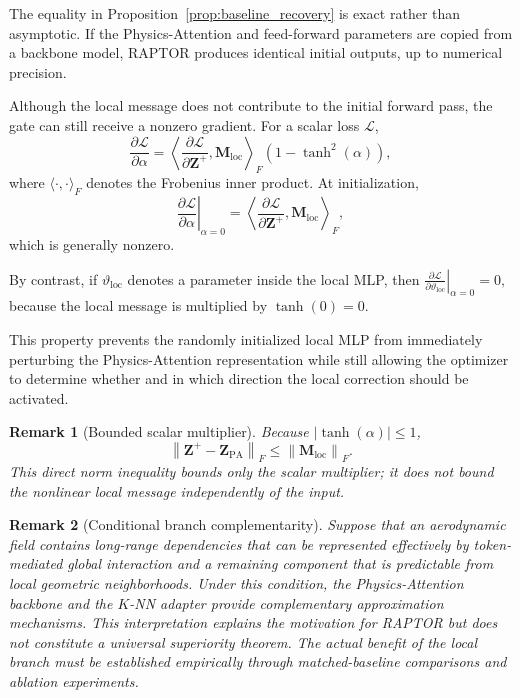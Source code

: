 \documentclass[a4paper,fleqn]{cas-sc}
\newtheorem{remark}{Remark}[section]
\begin{document}
The equality in Proposition~\ref{prop:baseline_recovery} is exact rather than asymptotic. If the Physics-Attention and feed-forward parameters are copied from a backbone model, RAPTOR produces identical initial outputs,
up to numerical precision. 

Although the local message does not contribute to the initial forward pass, the gate can still receive a nonzero gradient. For a scalar loss \(\mathcal L\),
\begin{equation}
    \frac{\partial\mathcal L}{\partial\alpha}
    =
    \left\langle
        \frac{\partial\mathcal L}
        {\partial\mathbf Z^{+}},
        \mathbf M_{\mathrm{loc}}
    \right\rangle_F
    \left(
        1-\tanh^2(\alpha)
    \right),
    \label{eq:gate_gradient}
\end{equation}
where \(\langle\cdot,\cdot\rangle_F\) denotes the Frobenius inner product. At initialization,
\begin{equation}
    \left.
        \frac{\partial\mathcal L}{\partial\alpha}
    \right|_{\alpha=0}
    =
    \left\langle
        \frac{\partial\mathcal L}
        {\partial\mathbf Z^{+}},
        \mathbf M_{\mathrm{loc}}
    \right\rangle_F,
    \label{eq:initial_gate_gradient}
\end{equation}
which is generally nonzero.

By contrast, if \(\vartheta_{\mathrm{loc}}\) denotes a parameter inside the local MLP, then $\left.
        \frac{\partial\mathcal L}
        {\partial\vartheta_{\mathrm{loc}}}
    \right|_{\alpha=0}
    =
    0,$
because the local message is multiplied by \(\tanh(0)=0\).

This property prevents the randomly initialized local MLP from immediately perturbing the Physics-Attention representation while still allowing the optimizer to determine whether and in which direction the local correction
should be activated.

\begin{remark}[Bounded scalar multiplier]
Because \(|\tanh(\alpha)|\leq1\),
\[
\left\|\mathbf Z^{+}-\mathbf Z_{\mathrm{PA}}\right\|_F
\leq \left\|\mathbf M_{\mathrm{loc}}\right\|_F .
\]
This direct norm inequality bounds only the scalar multiplier; it does not bound the nonlinear local message independently of the input.
\end{remark}

\begin{remark}[Conditional branch complementarity]
\label{rem:conditional_complementarity}
Suppose that an aerodynamic field contains long-range dependencies that
can be represented effectively by token-mediated global interaction and
a remaining component that is predictable from local geometric
neighborhoods. Under this condition, the Physics-Attention backbone and
the \(K\)-NN adapter provide complementary approximation mechanisms.
This interpretation explains the motivation for RAPTOR but does not
constitute a universal superiority theorem. The actual benefit of the
local branch must be established empirically through matched-baseline
comparisons and ablation experiments.
\end{remark}
\end{document}
